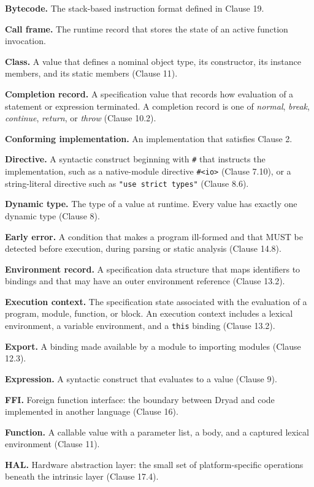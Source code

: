 \documentclass[
  english,
  11pt,
  a4paper,
]{article}
\begin{document}
\textbf{Bytecode.} The stack-based instruction format defined in Clause
19.

\textbf{Call frame.} The runtime record that stores the state of an
active function invocation.

\textbf{Class.} A value that defines a nominal object type, its
constructor, its instance members, and its static members (Clause 11).

\textbf{Completion record.} A specification value that records how
evaluation of a statement or expression terminated. A completion record
is one of \emph{normal}, \emph{break}, \emph{continue}, \emph{return},
or \emph{throw} (Clause 10.2).

\textbf{Conforming implementation.} An implementation that satisfies
Clause 2.

\textbf{Directive.} A syntactic construct beginning with \texttt{\#}
that instructs the implementation, such as a native-module directive
\texttt{\#\textless{}io\textgreater{}} (Clause 7.10), or a
string-literal directive such as \texttt{"use\ strict\ types"} (Clause
8.6).

\textbf{Dynamic type.} The type of a value at runtime. Every value has
exactly one dynamic type (Clause 8).

\textbf{Early error.} A condition that makes a program ill-formed and
that MUST be detected before execution, during parsing or static
analysis (Clause 14.8).

\textbf{Environment record.} A specification data structure that maps
identifiers to bindings and that may have an outer environment reference
(Clause 13.2).

\textbf{Execution context.} The specification state associated with the
evaluation of a program, module, function, or block. An execution
context includes a lexical environment, a variable environment, and a
\texttt{this} binding (Clause 13.2).

\textbf{Export.} A binding made available by a module to importing
modules (Clause 12.3).

\textbf{Expression.} A syntactic construct that evaluates to a value
(Clause 9).

\textbf{FFI.} Foreign function interface: the boundary between Dryad and
code implemented in another language (Clause 16).

\textbf{Function.} A callable value with a parameter list, a body, and a
captured lexical environment (Clause 11).

\textbf{HAL.} Hardware abstraction layer: the small set of
platform-specific operations beneath the intrinsic layer (Clause 17.4).
\end{document}
